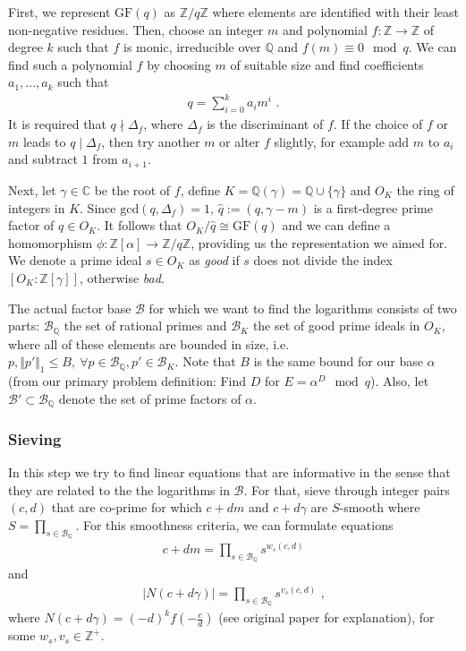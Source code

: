 \documentclass[paper=a4, fontsize=11pt]{scrartcl} %
\numberwithin{equation}{section} %
\numberwithin{figure}{section} %
\numberwithin{table}{section} %
\begin{document}
First, we represent $\mathrm{GF}(q)$ as $\mathbb{Z}/q\mathbb{Z}$ where elements are identified with their least non-negative residues. Then, choose an integer $m$ and polynomial $f:\mathbb{Z}\rightarrow\mathbb{Z}$ of degree $k$ such that $f$ is monic, irreducible over $\mathbb{Q}$ and $f(m)\equiv 0 \mod q$. We can find such a polynomial $f$ by choosing $m$ of suitable size and find coefficients $a_1,...,a_k$ such that
\begin{eqnarray}
q = \sum_{i=0}^{k}a_im^i
\text{ .}
\end{eqnarray}
It is required that $q\nmid\Delta_f$, where $\Delta_f$ is the discriminant of $f$. If the choice of $f$ or $m$ leads to $q\mid\Delta_f$, then try another $m$ or alter $f$ slightly, for example add $m$ to $a_i$ and subtract $1$ from $a_{i+1}$.

Next, let $\gamma\in\mathbb{C}$ be the root of $f$, define $K = \mathbb{Q}(\gamma) = \mathbb{Q}\cup\{\gamma\}$ and $O_K$ the ring of integers in $K$. Since $\mathrm{gcd}(q,\Delta_f) = 1$, $\hat{q}:=(q,\gamma-m)$ is a first-degree prime factor of $q\in O_K$. It follows that $O_K/\hat{q}\cong\mathrm{GF}(q)$ and we can define a homomorphism $\phi:\mathbb{Z}[\alpha]\rightarrow\mathbb{Z}/q\mathbb{Z}$, providing us the representation we aimed for. We denote a prime ideal $s\in O_K$ as \textit{good} if $s$ does not divide the index $[O_K:\mathbb{Z}[\gamma]]$, otherwise \textit{bad}.

The actual factor base $\mathcal{B}$ for which we want to find the logarithms consists of two parts: $\mathcal{B}_\mathbb{Q}$ the set of rational primes and $\mathcal{B}_K$ the set of good prime ideals in $O_K$, where all of these elements are bounded in size, i.e. $p,\Vert p'\Vert_1\leq B,\ \forall p\in\mathcal{B}_\mathbb{Q},p'\in\mathcal{B}_K$. Note that $B$ is the same bound for our base $\alpha$ (from our primary problem definition: Find $D$ for $E=\alpha^D\mod q$). Also, let $\mathcal{B}'\subset\mathcal{B}_\mathbb{Q}$ denote the set of prime factors of $\alpha$.

\subsubsection{Sieving}
In this step we try to find linear equations that are informative in the sense that they are related to the the logarithms in $\mathcal{B}$. For that, sieve through integer pairs $(c,d)$ that are co-prime for which $c+dm$ and $c+d\gamma$ are $S$-smooth where $S = \prod_{s\in\mathcal{B}_\mathbb{Q}}$. For this smoothness criteria, we can formulate equations
\begin{eqnarray}
c+dm = \prod_{s\in\mathcal{B}_\mathbb{Q}}s^{w_s(c,d)}
\end{eqnarray}
and
\begin{eqnarray}
|N(c+d\gamma)| = \prod_{s\in\mathcal{B}_\mathbb{Q}}s^{v_s(c,d)}
\text{ ,}
\end{eqnarray}
where $N(c+d\gamma) = (-d)^kf(-\frac{c}{d})$ (see original paper \citep{gordon1993discrete} for explanation), for some $w_s,v_s\in\mathbb{Z}^+$.
\end{document}
